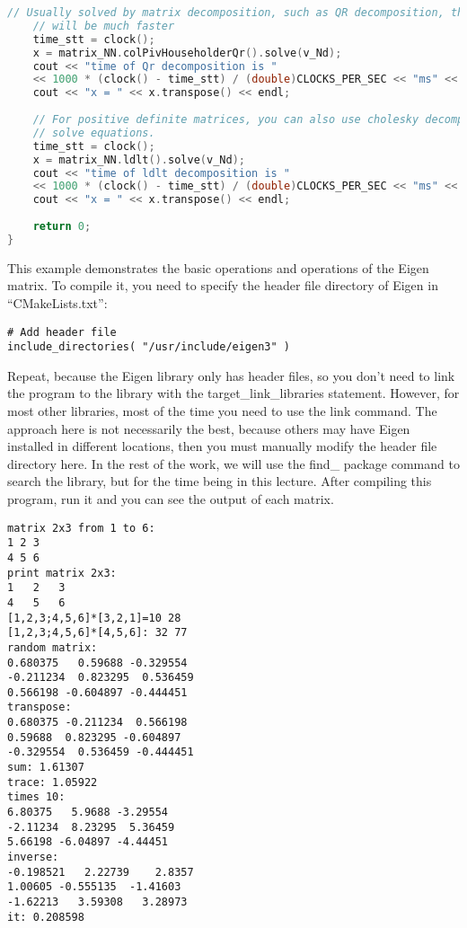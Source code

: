 \begin{lstlisting}[language=c++,caption=slambook2/ch3/useEigen/eigenMatrix.cpp]
    // Usually solved by matrix decomposition, such as QR decomposition, the speed
    // will be much faster
    time_stt = clock();
    x = matrix_NN.colPivHouseholderQr().solve(v_Nd);
    cout << "time of Qr decomposition is "
    << 1000 * (clock() - time_stt) / (double)CLOCKS_PER_SEC << "ms" << endl;
    cout << "x = " << x.transpose() << endl;
    
    // For positive definite matrices, you can also use cholesky decomposition to
    // solve equations.
    time_stt = clock();
    x = matrix_NN.ldlt().solve(v_Nd);
    cout << "time of ldlt decomposition is "
    << 1000 * (clock() - time_stt) / (double)CLOCKS_PER_SEC << "ms" << endl;
    cout << "x = " << x.transpose() << endl;
    
    return 0;
}
\end{lstlisting}

This example demonstrates the basic operations and operations of the Eigen matrix. To compile it, you need to specify the header file directory of Eigen in ``CMakeLists.txt'':
\begin{lstlisting}[caption=slambook2/ch3/useEigen/CMakeLists.txt]
# Add header file
include_directories( "/usr/include/eigen3" )
\end{lstlisting}

Repeat, because the Eigen library only has header files, so you don't need to link the program to the library with the target\_link\_libraries statement. However, for most other libraries, most of the time you need to use the link command. The approach here is not necessarily the best, because others may have Eigen installed in different locations, then you must manually modify the header file directory here. In the rest of the work, we will use the find\_ package command to search the library, but for the time being in this lecture. After compiling this program, run it and you can see the output of each matrix.

\begin{lstlisting}[caption=Terminal input:]
% build/eigenMatrix
matrix 2x3 from 1 to 6: 
1 2 3
4 5 6
print matrix 2x3: 
1	2	3	
4	5	6	
[1,2,3;4,5,6]*[3,2,1]=10 28
[1,2,3;4,5,6]*[4,5,6]: 32 77
random matrix: 
0.680375   0.59688 -0.329554
-0.211234  0.823295  0.536459
0.566198 -0.604897 -0.444451
transpose: 
0.680375 -0.211234  0.566198
0.59688  0.823295 -0.604897
-0.329554  0.536459 -0.444451
sum: 1.61307
trace: 1.05922
times 10: 
6.80375   5.9688 -3.29554
-2.11234  8.23295  5.36459
5.66198 -6.04897 -4.44451
inverse: 
-0.198521   2.22739    2.8357
1.00605 -0.555135  -1.41603
-1.62213   3.59308   3.28973
it: 0.208598
\end{lstlisting}

